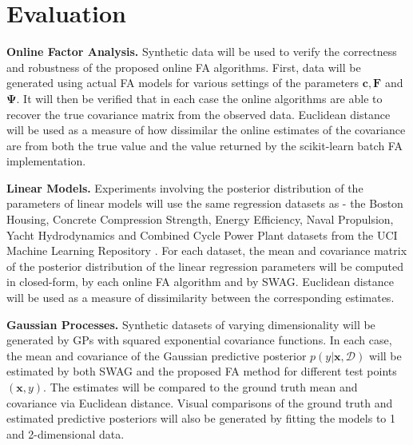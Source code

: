 \documentclass[a4paper,11pt]{article}
\newcommand{\matr}[1]{\mathbf{#1}}
\begin{document}
\section{Evaluation}\label{sec:evaluation}

\textbf{Online Factor Analysis. } Synthetic data will be used to verify the correctness and robustness of the proposed online FA algorithms. First, data will be generated using actual FA models for various settings of the parameters $\matr{c}, \matr{F}$ and $\matr{\Psi}$. It will then be verified that in each case the online algorithms are able to recover the true covariance matrix from the observed data. Euclidean distance will be used as a measure of how dissimilar the online estimates of the covariance are from both the true value and the value returned by the scikit-learn batch FA implementation. 

\textbf{Linear Models. } Experiments involving the posterior distribution of the parameters of linear models will use the same regression datasets as \cite{maddox2019} - the Boston Housing, Concrete Compression Strength, Energy Efficiency, Naval Propulsion, Yacht Hydrodynamics and Combined Cycle Power Plant datasets from the UCI Machine Learning Repository \cite{dua2019}. 
For each dataset, the mean and covariance matrix of the posterior distribution of the linear regression parameters will be computed in closed-form, by each online FA algorithm and by SWAG. Euclidean distance will be used as a measure of dissimilarity between the corresponding estimates. 

\textbf{Gaussian Processes. } Synthetic datasets of varying dimensionality will be generated by GPs with squared exponential covariance functions. In each case, the mean and covariance of the Gaussian predictive posterior $p(y | \matr{x}, \mathcal{D})$ will be estimated by both SWAG and the proposed FA method for different test points $(\matr{x}, y)$. The estimates will be compared to the ground truth mean and covariance via Euclidean distance. Visual comparisons of the ground truth and estimated predictive posteriors will also be generated by fitting the models to 1 and 2-dimensional data. 
\end{document}
